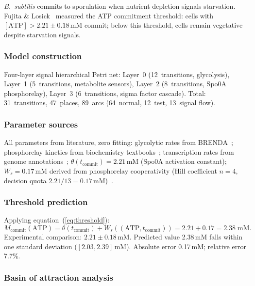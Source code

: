 \documentclass[11pt,a4paper]{article}
\theoremstyle{plain}
\theoremstyle{definition}
\begin{document}
\textit{B.~subtilis} commits to sporulation when nutrient depletion signals starvation. Fujita \& Losick~\cite{fujita2005} measured the ATP commitment threshold: cells with $[\mathrm{ATP}] > 2.21 \pm 0.18$\,mM commit; below this threshold, cells remain vegetative despite starvation signals.

\subsubsection{Model construction}

Four-layer signal hierarchical Petri net: Layer~0 (12~transitions, glycolysis), Layer~1 (5~transitions, metabolite sensors), Layer~2 (8~transitions, Spo0A phosphorelay), Layer~3 (6~transitions, sigma factor cascade). Total: 31~transitions, 47~places, 89~arcs (64~normal, 12~test, 13~signal flow).

\subsubsection{Parameter sources}

All parameters from literature, zero fitting: glycolytic rates from BRENDA~\cite{schomburg2004}; phosphorelay kinetics from biochemistry textbooks~\cite{voet2016}; transcription rates from genome annotations~\cite{barbe2009}; $\theta(t_{\mathrm{commit}}) = 2.21$\,mM (Spo0A activation constant); $W_s = 0.17$\,mM derived from phosphorelay cooperativity (Hill coefficient $n=4$, decision quota $2.21/13 = 0.17$\,mM)~\cite{ferrell1996}.

\subsubsection{Threshold prediction}

Applying equation~(\ref{eq:threshold}):
\begin{equation}
M_{\mathrm{commit}}(\mathrm{ATP}) = \theta(t_{\mathrm{commit}}) + W_s((\mathrm{ATP}, t_{\mathrm{commit}})) = 2.21 + 0.17 = 2.38\;\text{mM}.
\end{equation}
Experimental comparison: $2.21 \pm 0.18$\,mM. Predicted value 2.38\,mM falls within one standard deviation ($[2.03, 2.39]$\,mM). Absolute error 0.17\,mM; relative error 7.7\%.

\subsubsection{Basin of attraction analysis}
\end{document}
